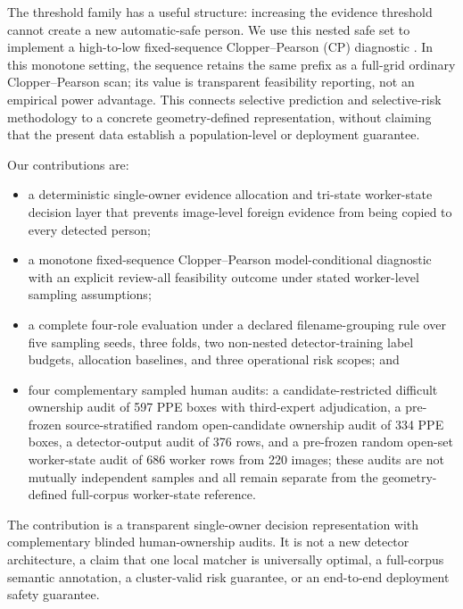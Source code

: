 \documentclass[iicol,pdflatex,sn-mathphys-num]{sn-jnl}
\begin{document}
The threshold family has a useful structure: increasing the evidence threshold cannot create a new automatic-safe person. We use this nested safe set to implement a high-to-low fixed-sequence Clopper--Pearson (CP) diagnostic \cite{clopper1934confidence}. In this monotone setting, the sequence retains the same prefix as a full-grid ordinary Clopper--Pearson scan; its value is transparent feasibility reporting, not an empirical power advantage. This connects selective prediction \cite{geifman2017selective} and selective-risk methodology \cite{angelopoulos2021learntest,angelopoulos2022conformal} to a concrete geometry-defined representation, without claiming that the present data establish a population-level or deployment guarantee.

Our contributions are:

\begin{itemize}
\item a deterministic single-owner evidence allocation and tri-state worker-state decision layer that prevents image-level foreign evidence from being copied to every detected person;
\item a monotone fixed-sequence Clopper--Pearson model-conditional diagnostic with an explicit review-all feasibility outcome under stated worker-level sampling assumptions;
\item a complete four-role evaluation under a declared filename-grouping rule over five sampling seeds, three folds, two non-nested detector-training label budgets, allocation baselines, and three operational risk scopes; and
\item four complementary sampled human audits: a candidate-restricted difficult ownership audit of 597 PPE boxes with third-expert adjudication, a pre-frozen source-stratified random open-candidate ownership audit of 334 PPE boxes, a detector-output audit of 376 rows, and a pre-frozen random open-set worker-state audit of 686 worker rows from 220 images; these audits are not mutually independent samples and all remain separate from the geometry-defined full-corpus worker-state reference.
\end{itemize}

The contribution is a transparent single-owner decision representation with complementary blinded human-ownership audits. It is not a new detector architecture, a claim that one local matcher is universally optimal, a full-corpus semantic annotation, a cluster-valid risk guarantee, or an end-to-end deployment safety guarantee.
\end{document}
